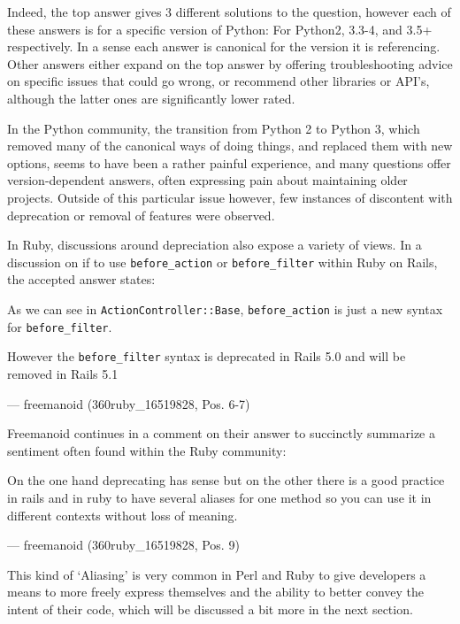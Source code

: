 Indeed, the top answer gives 3 different solutions to the question, however each of these answers is for a specific
version of Python: For Python2, 3.3-4, and 3.5+ respectively. In a sense each answer is canonical for the version it is
referencing. Other answers either expand on the top answer by offering troubleshooting advice on specific issues that
could go wrong, or recommend other libraries or API’s, although the latter ones are significantly lower rated.

In the Python community, the transition from Python 2 to Python 3, which removed many of the canonical ways of doing things,
and replaced them with new options, seems to have been a rather painful experience, and many questions offer version-dependent
answers, often expressing pain about maintaining older projects. Outside of this particular issue however, few instances
of discontent with deprecation or removal of features were observed.

In Ruby, discussions around depreciation also expose a variety of views. In a discussion on if to use \texttt{before\_action} or
\texttt{before\_filter} within Ruby on Rails, the accepted answer states:

\begin{displayquote}
    As we can see in \texttt{ActionController::Base}, \texttt{before\_action} is just a new syntax for \texttt{before\_filter}.

    However the \texttt{before\_filter} syntax is deprecated in Rails 5.0 and will be removed in Rails 5.1

    --- freemanoid (360ruby\_16519828, Pos. 6-7)
\end{displayquote}

Freemanoid continues in a comment on their answer to succinctly summarize a sentiment often found within the Ruby community:

\begin{displayquote}
    On the one hand deprecating has sense but on the other there is a good practice in rails and in ruby to have several
    aliases for one method so you can use it in different contexts without loss of meaning.

    --- freemanoid (360ruby\_16519828, Pos. 9)
\end{displayquote}

This kind of ‘Aliasing’ is very common in Perl and Ruby to give developers a means to more freely express themselves and
the ability to better convey the intent of their code, which will be discussed a bit more in the next section.

